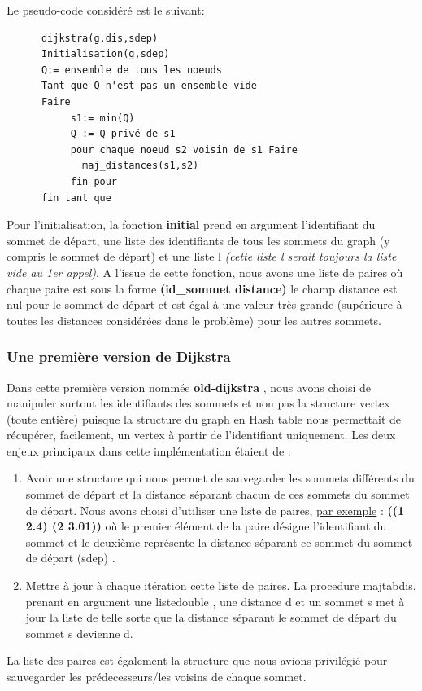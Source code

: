 \documentclass[french]{article}
\begin{document}
Le pseudo-code considéré est le suivant: \\
\begin{lstlisting}
      dijkstra(g,dis,sdep)                                  
      Initialisation(g,sdep)                                
      Q:= ensemble de tous les noeuds
      Tant que Q n'est pas un ensemble vide
      Faire
           s1:= min(Q)
           Q := Q privé de s1
           pour chaque noeud s2 voisin de s1 Faire
             maj_distances(s1,s2)
           fin pour
      fin tant que
\end{lstlisting}

Pour l'initialisation, la fonction \textbf{initial} prend en argument l'identifiant du sommet de départ, une liste des identifiants de tous les sommets du graph (y compris le sommet de départ) et une liste l \textit{(cette liste l serait toujours la liste vide au 1er appel)}. 
\newline
A l'issue de cette fonction, nous avons une liste de paires où chaque paire est sous la forme \textbf{(id\_sommet distance)} le champ distance est nul pour le sommet de départ et est égal à une valeur très grande (supérieure à toutes les distances considérées dans le problème) pour les autres sommets.\newline

\subsubsection{Une première version de Dijkstra}
Dans cette première version nommée \textbf{old-dijkstra} , nous avons choisi de manipuler surtout les identifiants des sommets et non pas la structure vertex (toute entière) puisque la structure du graph en Hash table nous permettait de récupérer, facilement, un vertex à partir de l'identifiant uniquement. Les deux enjeux principaux dans cette implémentation étaient de :

\begin{enumerate}

\item Avoir une structure qui nous permet de sauvegarder les sommets différents du sommet de départ et la distance séparant chacun de ces sommets du sommet de départ. Nous avons choisi d'utiliser une liste de paires, \underline{par exemple} : \textbf{((1 2.4) (2 3.01))} où le premier élément de la paire désigne l'identifiant du sommet et le deuxième représente la distance séparant ce sommet du sommet de départ (sdep) .

\item Mettre à jour à chaque itération cette liste de paires. La procedure majtabdis, prenant en argument une listedouble , une distance d et un sommet s met à jour la liste de telle sorte que la distance séparant le sommet de départ du sommet s devienne d.    
\end{enumerate}
La liste des paires est également la structure que nous avions privilégié pour sauvegarder les prédecesseurs/les voisins de chaque sommet. 
\end{document}
